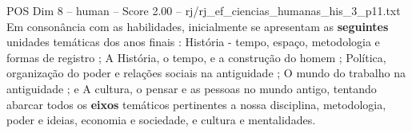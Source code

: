 \begin{textsample}{POS Dim 8 – human – Score 2.00 – rj/rj\_ef\_ciencias\_humanas\_his\_3\_p11.txt}  \label{ex:f8_pos_004}
Em consonância com as habilidades, inicialmente se apresentam as \textbf{seguintes} unidades temáticas dos anos finais : História - tempo, espaço, metodologia e formas de registro ; A História, o tempo, e a construção do homem ; Política, organização do poder e relações sociais na antiguidade ; O mundo do trabalho na antiguidade ; e A cultura, o pensar e as pessoas no mundo antigo, tentando abarcar todos os \textbf{eixos} temáticos pertinentes a nossa disciplina, metodologia, poder e ideias, economia e sociedade, e cultura e mentalidades.

\end{textsample}
